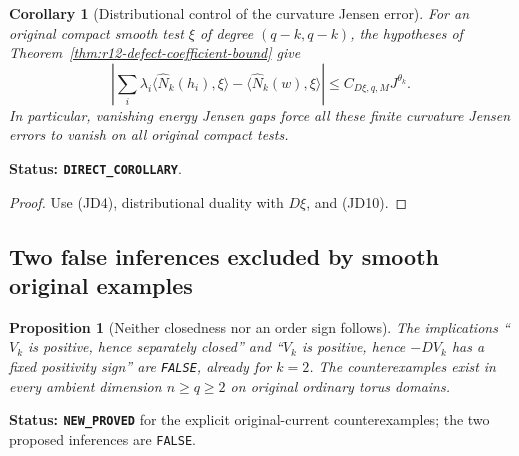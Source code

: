 \documentclass[11pt,a4paper]{article}
\numberwithin{equation}{section}
\newtheorem{proposition}[theorem]{Proposition}
\newtheorem{corollary}[theorem]{Corollary}
\theoremstyle{definition}
\theoremstyle{remark}
\begin{document}
\begin{corollary}[Distributional control of the curvature Jensen error]
\label{cor:r12-curvature-jensen-error}
For an original compact smooth test $\xi$ of degree $(q-k,q-k)$,
the hypotheses of Theorem~\ref{thm:r12-defect-coefficient-bound} give
\[
 \left|\sum_i\lambda_i\langle\widehat N_k(h_i),\xi\rangle
                  -\langle\widehat N_k(w),\xi\rangle\right|
       \leq C_{D\xi,q,M}J^{\theta_k}.
 \tag{JD16}
\]
In particular, vanishing energy Jensen gaps force all these finite
curvature Jensen errors to vanish on all original compact tests.
\end{corollary}

\noindent\textbf{Status: \texttt{DIRECT\_COROLLARY}}.

\begin{proof}
Use (JD4), distributional duality with $D\xi$, and (JD10).
\end{proof}

\subsection{Two false inferences excluded by smooth original examples}

\begin{proposition}[Neither closedness nor an order sign follows]
\label{prop:r12-jensen-defect-sign-counterexamples}
The implications ``$V_k$ is positive, hence separately closed'' and
``$V_k$ is positive, hence $-DV_k$ has a fixed positivity sign'' are
\texttt{FALSE}, already for $k=2$.  The counterexamples exist in every
ambient dimension $n\geq q\geq2$ on original ordinary torus domains.
\end{proposition}

\noindent\textbf{Status: \texttt{NEW\_PROVED}} for the explicit
original-current counterexamples; the two proposed inferences are
\texttt{FALSE}.
\end{document}
